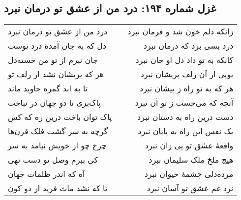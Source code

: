\begin{center}
\section*{غزل شماره ۱۹۴: درد من از عشق تو درمان نبرد}
\label{sec:194}
\begin{longtable}{l p{0.5cm} r}
درد من از عشق تو درمان نبرد
&&
زانکه دلم خون شد و فرمان نبرد
\\
دل که به جان آمدهٔ درد توست
&&
درد بسی برد که درمان نبرد
\\
جان نبرم از تو من خسته‌دل
&&
کانکه به تو داد دل او جان نبرد
\\
هر که پریشان نشد از زلف تو
&&
بویی از آن زلف پریشان نبرد
\\
تا به ابد گمره جاوید ماند
&&
هر که به تو راه ز پیشان نبرد
\\
پاک‌بری تا دو جهان در نباخت
&&
آنچه که می‌جست ز تو آن نبرد
\\
پاک توان باخت درین ره که کس
&&
دست درین راه به دستان نبرد
\\
گرچه به سر گشت فلک قرن‌ها
&&
یک نفس این راه به پایان نبرد
\\
چرخ چو از خویش نیامد به سر
&&
واقعهٔ عشق تو پی زان نبرد
\\
کی ببرم وصل تو دست تهی
&&
هیچ ملخ ملک سلیمان نبرد
\\
آه که اندر ظلمات جهان
&&
مرده‌دلی چشمهٔ حیوان نبرد
\\
تا که نشد مات فرید از دو کون
&&
نرد غم عشق تو آسان نبرد
\\
\end{longtable}
\end{center}
